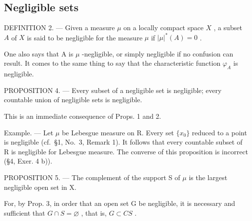 \subsection{Negligible sets}

DEFINITION 2. --- Given a measure \(\mu\) on a locally compact space \(X\) , a subset \(A\) of \(X\) is said to be negligible for the measure \(\mu\) if \(|\mu|^*(A) = 0\) .

One also says that A is \(\mu\) -negligible, or simply negligible if no confusion can result. It comes to the same thing to say that the characteristic function \(\varphi_{A}\) is negligible.

PROPOSITION 4. --- Every subset of a negligible set is negligible; every countable union of negligible sets is negligible.

This is an immediate consequence of Props. 1 and 2.

Example. --- Let \(\mu\) be Lebesgue measure on R. Every set \(\{x_{0}\}\) reduced to a point is negligible (cf.~§1, No.~3, Remark 1). It follows that every countable subset of R is negligible for Lebesgue measure. The converse of this proposition is incorrect (§4, Exer. 4 b)).

PROPOSITION 5. --- The complement of the support S of \(\mu\) is the largest negligible open set in X.

For, by Prop. 3, in order that an open set G be negligible, it is necessary and sufficient that \(G \cap S = \varnothing\) , that is, \(G \subset CS\) .

